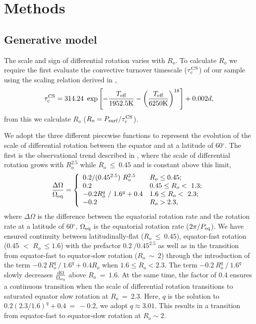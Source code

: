 \section{Methods}
\label{sec:methods}

\subsection{Generative model}

The scale and sign of differential rotation varies with $R_o$.
To calculate $R_o$ we require the first evaluate the convective turnover timescale ($\tau_c^{\rm{CS}}$) of our sample using the scaling relation derived in \citet{cranmer_testing_2011},
\begin{equation}
	\tau_c^{\rm{CS}} = 314.24 \ \exp\left[ -\frac{T_{\rm{eff}}}{1952.5\rm{K}} - \left( \frac{T_{\rm{eff}}}{6250 \rm{K}}\right)^{18}\right] + 0.002 d,
\end{equation}
from this we calculate $R_o$ ($R_o = P_{\rm{surf}}/\tau_c^{\rm{CS}}$).

We adopt the three different piecewise functions to represent the evolution of the scale of differential rotation between the equator and at a latitude of 60$^{\circ}$.
The first is the observational trend described in \citet{saar_starspots_2011}, where the scale of differential rotation grows with $R_o^{2.5}$ while $R_o \ \leq \ 0.45$ and is constant above this limit,
\begin{equation}
\label{eq:rot_saar}
{\centering
\frac{\Delta\Omega}{\Omega_{\rm{eq}}} = \left\{
\begin{array}{ll}
 0.2/(0.45^{2.5}) \ R_o^{2.5}& R_o\leq 0.45; \\
 0.2 & 0.45 \leq R_o < \ 1.3;\\
 -0.2 R_o^q \ / \ 1.6^q + 0.4 & 1.6 \leq R_o < \ 2.3;\\
 -0.2 & R_o > 2.3,
\end{array} 
\right.}
\end{equation}
where $\Delta \Omega$ is the difference between the equatorial rotation rate and the rotation rate at a latitude of 60$^{\circ}$, $\Omega_{\rm{eq}}$ is the equatorial rotation rate ($2\pi/P_{\rm{eq}}$).
We have ensured continuity between latitudinally-flat ($R_o \ \leq \ 0.45$), equator-fast rotation (0.45 $<$ $R_o \ \leq 1.6$) with the prefactor $0.2 \ / 0.45^{2.5}$ as well as in the transition from equator-fast to equator-slow rotation ($R_o \ \sim \ 2$) through the introduction of the term $-0.2 \ R_o^q \ / \ 1.6^q + 0.4 R_o$ when $1.6 \leq R_o < 2.3$.
The term $-0.2 \ R_o^q \ / \ 1.6^q$ slowly decreases $\frac{\rm{d}\Omega}{\Omega_{\rm{eq}}}$ above $R_o \ = \ 1.6$. At the same time, the factor of $0.4$ ensures a continuous transition when the scale of differential rotation transitions to saturated equator slow rotation at $R_o \ = \ 2.3$.
Here, $q$ is the solution to $0.2 \left(2.3/1.6\right)^q + 0.4 \ = \ -0.2 $, we adopt $q \approx 3.01$.
This results in a transition from equator-fast to equator-slow rotation at $R_o \sim 2$.

